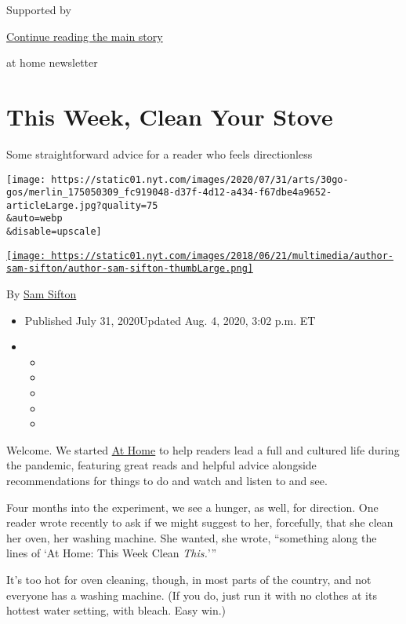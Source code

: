 Supported by

\protect\hyperlink{after-sponsor}{Continue reading the main story}

at home newsletter

\hypertarget{this-week-clean-your-stove}{%
\section{This Week, Clean Your Stove}\label{this-week-clean-your-stove}}

Some straightforward advice for a reader who feels directionless

\texttt{[image: https://static01.nyt.com/images/2020/07/31/arts/30go-gos/merlin\_175050309\_fc919048-d37f-4d12-a434-f67dbe4a9652-articleLarge.jpg?quality=75\\\&auto=webp\\\&disable=upscale]}

\href{https://www.nytimes.com/by/sam-sifton}{\texttt{[image: https://static01.nyt.com/images/2018/06/21/multimedia/author-sam-sifton/author-sam-sifton-thumbLarge.png]}}

By \href{https://www.nytimes.com/by/sam-sifton}{Sam Sifton}

\begin{itemize}
\item
  Published July 31, 2020Updated Aug. 4, 2020, 3:02 p.m. ET
\item
  \begin{itemize}
  \item
  \item
  \item
  \item
  \item
  \end{itemize}
\end{itemize}

Welcome. We started \href{https://www.nytimes.com/spotlight/at-home}{At
Home} to help readers lead a full and cultured life during the pandemic,
featuring great reads and helpful advice alongside recommendations for
things to do and watch and listen to and see.

Four months into the experiment, we see a hunger, as well, for
direction. One reader wrote recently to ask if we might suggest to her,
forcefully, that she clean her oven, her washing machine. She wanted,
she wrote, ``something along the lines of `At Home: This Week Clean
\emph{This.}'''

It's too hot for oven cleaning, though, in most parts of the country,
and not everyone has a washing machine. (If you do, just run it with no
clothes at its hottest water setting, with bleach. Easy win.)

